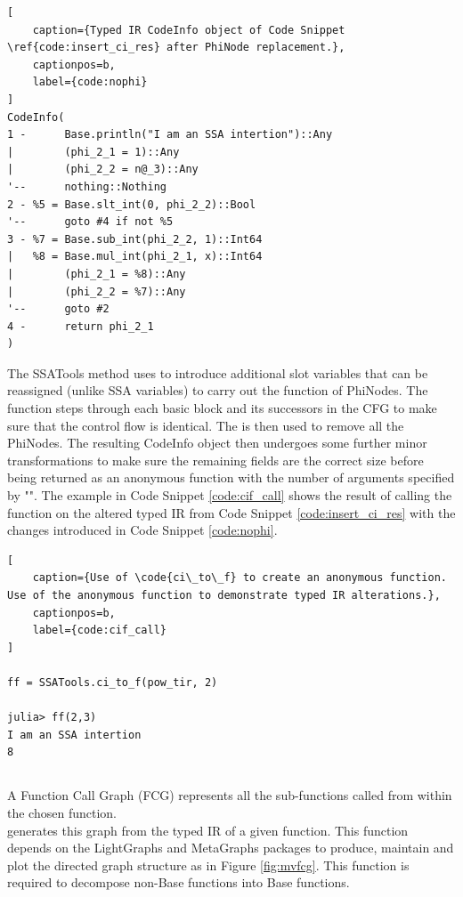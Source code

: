 \pagebreak

\begin{lstlisting}[
    caption={Typed IR CodeInfo object of Code Snippet \ref{code:insert_ci_res} after PhiNode replacement.},
    captionpos=b, 
    label={code:nophi}
]
CodeInfo(
1 -      Base.println("I am an SSA intertion")::Any
|        (phi_2_1 = 1)::Any
|        (phi_2_2 = n@_3)::Any
'--      nothing::Nothing
2 - %5 = Base.slt_int(0, phi_2_2)::Bool
'--      goto #4 if not %5
3 - %7 = Base.sub_int(phi_2_2, 1)::Int64
|   %8 = Base.mul_int(phi_2_1, x)::Int64
|        (phi_2_1 = %8)::Any
|        (phi_2_2 = %7)::Any
'--      goto #2
4 -      return phi_2_1
)
\end{lstlisting}

The SSATools method  uses  to introduce additional slot variables that can be reassigned (unlike SSA variables) to carry out the function of PhiNodes. The function steps through each basic block and its successors in the CFG to make sure that the control flow is identical. The  is then used to remove all the PhiNodes. The resulting CodeInfo object then undergoes some further minor transformations to make sure the remaining fields are the correct size before being returned as an anonymous function with the number of arguments specified by "". The example in Code Snippet \ref{code:cif_call} shows the result of calling the  function on the altered typed IR from Code Snippet \ref{code:insert_ci_res} with the changes introduced in Code Snippet \ref{code:nophi}.

\begin{lstlisting}[
    caption={Use of \code{ci\_to\_f} to create an anonymous function. Use of the anonymous function to demonstrate typed IR alterations.},
    captionpos=b, 
    label={code:cif_call}
]

ff = SSATools.ci_to_f(pow_tir, 2)

julia> ff(2,3)
I am an SSA intertion
8
\end{lstlisting}

\subsection{}
A Function Call Graph (FCG) represents all the sub-functions called from within the chosen function. \\  generates this graph from the typed IR of a given function. This function depends on the LightGraphs \cite{julia_lightgrph} and MetaGraphs \cite{julia_metagrph} packages to produce, maintain and plot the directed graph structure as in Figure \ref{fig:mvfcg}. This function is required to decompose non-Base functions into Base functions.

